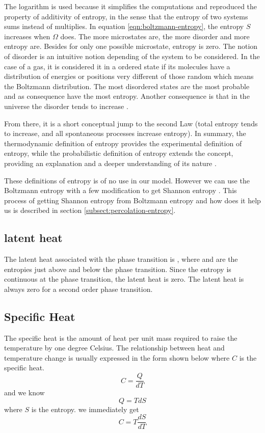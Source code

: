 	
	The logarithm is used because it simplifies the computations and reproduced the property of additivity of entropy, in the sense that the entropy of two systems sums instead of multiplies. In	equation \ref{eqn:boltzmann-entropy}, the entropy $S$ increases when $\Omega$ does. The more microstates are, the more disorder	and more entropy are. Besides for only one possible microstate, entropy is zero. The notion of	disorder is an intuitive notion depending of the system to be considered. In the case of a gas, it	is considered it in a ordered state if its molecules have a distribution of energies or positions very	different of those random which means the Boltzmann distribution. The most disordered states are	the most probable and as consequence have the most entropy. Another consequence is that in the	universe the disorder tends to increase \cite{Balibrea2016}.
	
	
	From there, it is a short conceptual jump to the second Law (total entropy tends to increase, and	all spontaneous processes increase entropy). In summary, the thermodynamic definition of entropy provides the experimental definition of entropy, while the probabilistic definition of entropy	extends the concept, providing an explanation and a deeper understanding of its nature \cite{Alam2016}.
	
	These definitions of entropy is of no use in our model. However we can use the Boltzmann entropy with a few modification to get Shannon entropy \cite{shanon_entropy}. This process of getting Shannon entropy from Boltzmann entropy and how does it help us is described in section \ref{subsect:percolation-entropy}.
	
	\subsection{latent heat}
	The latent heat associated with the phase transition is , where and are the entropies just above and below the phase transition. Since the entropy is continuous at the phase transition, the latent heat is zero. The latent heat is always zero for a second order phase transition.
	\subsection{Specific Heat}
	The specific heat is the amount of heat per unit mass required to raise the temperature by one degree Celsius. The relationship between heat and temperature change is usually expressed in the form shown below where $C$ is the specific heat.
	\begin{equation}
		C = \frac{Q}{dT}
	\end{equation}
	and we know
	\begin{equation}
		Q = T dS
	\end{equation}
	where $S$ is the entropy. we immediately get
	\begin{equation}
		C = T \frac{dS}{dT}
		\label{def:specific-heat-thermodynamics}
	\end{equation}
	
